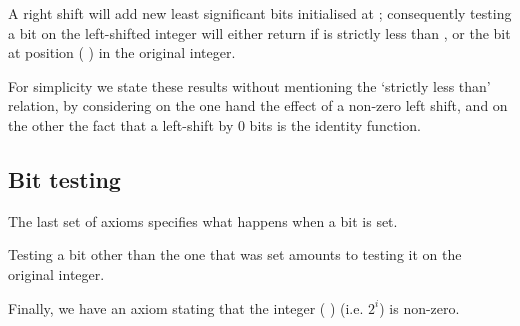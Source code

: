 
A right shift will add  new least significant bits initialised
at ; consequently testing a bit  on the left-shifted
integer will either return  if  is strictly less than
, or the bit at position ( \IdrisFunction{-} )
in the original integer.

For simplicity we state these results without mentioning the `strictly less than'
relation, by considering on the one hand the effect of a non-zero left shift,
and on the other the fact that a left-shift by 0 bits is the identity function.


\subsection{Bit testing}

The last set of axioms specifies what happens when a bit is set.

Testing a bit other than the one that was set amounts to testing it on the
original integer.


Finally, we have an axiom stating that the integer
( ) (i.e. $2^i$) is non-zero.

